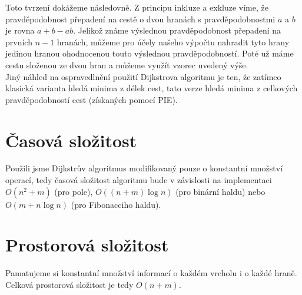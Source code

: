 \documentclass[11pt,a4paper]{article}
\begin{document}
Toto tvrzení dokážeme následovně. Z principu inkluze a exkluze víme, že pravděpodobnost přepadení na cestě o dvou hranách s pravděpodobnostmi $a$ a $b$ je rovna $a+b-ab$. Jelikož známe výslednou pravděpodobnost přepadení na prvních $n-1$ hranách, můžeme pro účely našeho výpočtu nahradit tyto hrany jedinou hranou ohodnocenou touto výslednou pravděpodobností. Poté už máme cestu složenou ze dvou hran a můžeme využít vzorec uvedený výše. \\

Jiný náhled na ospravedlnění použití Dijkstrova algoritmu je ten, že zatímco klasická varianta hledá minima z délek cest, tato verze hledá minima z celkových pravděpodobností cest (získaných pomocí PIE). 
\section{Časová složitost}
Použili jsme Dijkstrův algoritmus modifikovaný pouze o konstantní množství operací, tedy časová složitost algoritmu bude v závislosti na implementaci $O(n^2+m)$ (pro pole), $O((n+m)\log n)$ (pro binární haldu) nebo $O(m+n\log n)$ (pro Fibonacciho haldu).
\section{Prostorová složitost}
Pamatujeme si konstantní množství informací o každém vrcholu i o každé hraně. Celková prostorová složitost je tedy $O(n+m)$.
\end{document}
